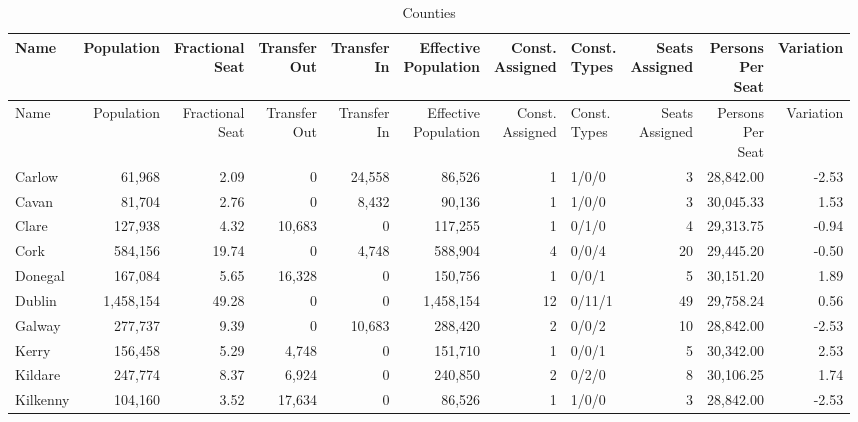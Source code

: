 \documentclass[a4paper]{article}
\begin{document}
\begin{longtable}{lrrrrrrlrrr}
\caption{Counties}
\\ \toprule
Name &Population &\shortstack{Fractional\\Seat} &\shortstack{Transfer\\Out} &\shortstack{Transfer\\In} &\shortstack{Effective\\Population} &\shortstack{Const.\\Assigned} &\shortstack{Const.\\Types} &\shortstack{Seats\\Assigned} &\shortstack{Persons\\Per\\Seat} &Variation \\ \midrule
\endfirsthead
\toprule
Name &Population &\shortstack{Fractional\\Seat} &\shortstack{Transfer\\Out} &\shortstack{Transfer\\In} &\shortstack{Effective\\Population} &\shortstack{Const.\\Assigned} &\shortstack{Const.\\Types} &\shortstack{Seats\\Assigned} &\shortstack{Persons\\Per\\Seat} &Variation \\ \midrule
\endhead
\bottomrule
\endfoot
Carlow&61,968& 2.09&0&24,558&86,526&1&1/0/0&3&28,842.00&-2.53\\ 
Cavan&81,704& 2.76&0&8,432&90,136&1&1/0/0&3&30,045.33& 1.53\\ 
Clare&127,938& 4.32&10,683&0&117,255&1&0/1/0&4&29,313.75&-0.94\\ 
Cork&584,156&19.74&0&4,748&588,904&4&0/0/4&20&29,445.20&-0.50\\ 
Donegal&167,084& 5.65&16,328&0&150,756&1&0/0/1&5&30,151.20& 1.89\\ 
Dublin&1,458,154&49.28&0&0&1,458,154&12&0/11/1&49&29,758.24& 0.56\\ 
Galway&277,737& 9.39&0&10,683&288,420&2&0/0/2&10&28,842.00&-2.53\\ 
Kerry&156,458& 5.29&4,748&0&151,710&1&0/0/1&5&30,342.00& 2.53\\ 
Kildare&247,774& 8.37&6,924&0&240,850&2&0/2/0&8&30,106.25& 1.74\\ 
Kilkenny&104,160& 3.52&17,634&0&86,526&1&1/0/0&3&28,842.00&-2.53\\ 

\end{longtable}
\end{document}
